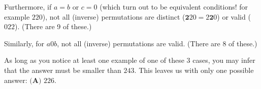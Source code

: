 \begin{enumerate}
 Furthermore, if $a=b$ or $c=0$ (which turn out to be equivalent conditions! for example $220$), not all (inverse) permutations are distinct ($\mathbf{2}20 = 2\mathbf{2}0$) or valid ($022$). (There are 9 of these.) 

 Similarly, for $a0b$, not all (inverse) permutations are valid. (There are 8 of these.)

 As long as you notice at least one example of one of these 3 cases, you may infer that the answer must be smaller than $243$. This leaves us with only one possible answer: $\boxed{\textbf{(A) } 226}$.

 


\end{enumerate}